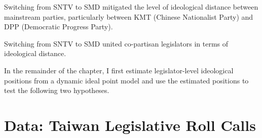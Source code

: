 
\begin{hyp}
Switching from SNTV to SMD mitigated the level of ideological distance between mainstream parties, particularly between KMT (Chinese Nationalist Party) and DPP (Democratic Progress Party).
\label{h:p1-h1} 
\end{hyp}

\begin{hyp}
Switching from SNTV to SMD united co-partisan legislators in terms of ideological distance.
\label{h:p1-h2} 
\end{hyp}


In the remainder of the chapter, I first estimate legislator-level ideological positions from a dynamic ideal point model and use the estimated positions to test the following two hypotheses.



\section*{\centering Data: Taiwan Legislative Roll Calls}

